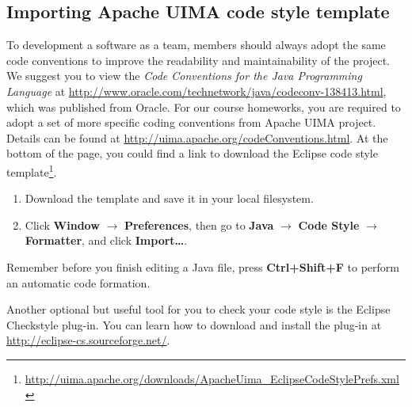 \subsection{Importing Apache UIMA code style template}

To development a software as a team, members should always adopt the same code conventions to improve the readability and maintainability of the project. We suggest you to view the \emph{Code Conventions for the Java Programming Language} at \url{http://www.oracle.com/technetwork/java/codeconv-138413.html}, which was published from Oracle. For our course homeworks, you are required to adopt a set of more specific coding conventions from Apache UIMA project. Details can be found at \url{http://uima.apache.org/codeConventions.html}. At the bottom of the page, you could find a link to download the Eclipse code style template\footnote{\url{http://uima.apache.org/downloads/ApacheUima_EclipseCodeStylePrefs.xml}}.

\begin{enumerate}
\item Download the template and save it in your local filesystem.
\item Click \textbf{Window} $\rightarrow$ \textbf{Preferences}, then go to \textbf{Java} $\rightarrow$ \textbf{Code Style} $\rightarrow$ \textbf{Formatter}, and click \textbf{Import\ldots}. 
\end{enumerate}

Remember before you finish editing a Java file, press \textbf{Ctrl+Shift+F} to perform an automatic code formation.

Another optional but useful tool for you to check your code style is the Eclipse Checkstyle plug-in. You can learn how to download and install the plug-in at \url{http://eclipse-cs.sourceforge.net/}.

